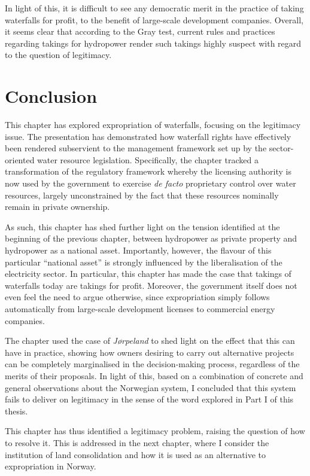 In light of this, it is difficult to see any democratic merit in the practice of taking waterfalls for profit, to the benefit of large-scale development companies. Overall, it seems clear that according to the Gray test, current rules and practices regarding takings for hydropower render such takings highly suspect with regard to the question of legitimacy.

\section{Conclusion}\label{sec:5:8}

This chapter has explored expropriation of waterfalls, focusing on the legitimacy issue. The presentation has demonstrated how waterfall rights have effectively been rendered subservient to the management framework set up by the sector-oriented water resource legislation. Specifically, the chapter tracked a transformation of the regulatory framework whereby the licensing authority is now used by the government to exercise {\it de facto} proprietary control over water resources, largely unconstrained by the fact that these resources nominally remain in private ownership.

As such, this chapter has shed further light on the tension identified at the beginning of the previous chapter, between hydropower as private property and hydropower as a national asset. Importantly, however, the flavour of this particular ``national asset'' is strongly influenced by the liberalisation of the electricity sector. In particular, this chapter has made the case that takings of waterfalls today are takings for profit. Moreover, the government itself does not even feel the need to argue otherwise, since expropriation simply follows automatically from large-scale development licenses to commercial energy companies.

The chapter used the case of {\it Jørpeland} to shed light on the effect that this can have in practice, showing how owners desiring to carry out alternative projects can be completely marginalised in the decision-making process, regardless of the merits of their proposals. In light of this, based on a combination of concrete and general observations about the Norwegian system, I concluded that this system fails to deliver on legitimacy in the sense of the word explored in Part I of this thesis. 

This chapter has thus identified a legitimacy problem, raising the question of how to resolve it. This is addressed in the next chapter, where I consider the institution of land consolidation and how it is used as an alternative to expropriation in Norway.%